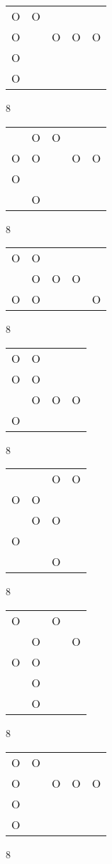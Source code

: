 \begin{tabular}{|m{0.2cm}m{0.2cm}m{0.2cm}m{0.2cm}m{0.2cm}|}\hline
O&O& & & \\
O& &O&O&O\\
O& & & & \\
O& & & & \\
\hline\end{tabular}8
\begin{tabular}{|m{0.2cm}m{0.2cm}m{0.2cm}m{0.2cm}m{0.2cm}|}\hline
 &O&O& & \\
O&O& &O&O\\
O& & & & \\
 &O& & & \\
\hline\end{tabular}8
\begin{tabular}{|m{0.2cm}m{0.2cm}m{0.2cm}m{0.2cm}m{0.2cm}|}\hline
O&O& & & \\
 &O&O&O& \\
O&O& & &O\\
\hline\end{tabular}8
\begin{tabular}{|m{0.2cm}m{0.2cm}m{0.2cm}m{0.2cm}|}\hline
O&O& & \\
O&O& & \\
 &O&O&O\\
O& & & \\
\hline\end{tabular}8
\begin{tabular}{|m{0.2cm}m{0.2cm}m{0.2cm}m{0.2cm}|}\hline
 & &O&O\\
O&O& & \\
 &O&O& \\
O& & & \\
 & &O& \\
\hline\end{tabular}8
\begin{tabular}{|m{0.2cm}m{0.2cm}m{0.2cm}m{0.2cm}|}\hline
O& &O& \\
 &O& &O\\
O&O& & \\
 &O& & \\
 &O& & \\
\hline\end{tabular}8
\begin{tabular}{|m{0.2cm}m{0.2cm}m{0.2cm}m{0.2cm}m{0.2cm}|}\hline
O&O& & & \\
O& &O&O&O\\
O& & & & \\
O& & & & \\
\hline\end{tabular}8
